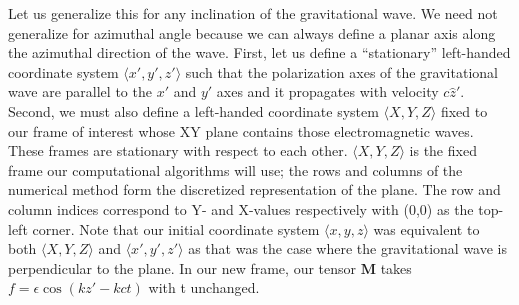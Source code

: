 \documentclass{article}
\begin{document}
Let us generalize this for any inclination of the gravitational wave. We need not generalize for azimuthal angle because we can always define a planar axis along the azimuthal direction of the wave. First, let us define a ``stationary'' left-handed coordinate system $\langle x\prime,y\prime,z\prime\rangle$ such that the polarization axes of the gravitational wave are parallel to the $x\prime$ and $y\prime$ axes and it propagates with velocity $c \hat z\prime$. Second, we must also define a left-handed coordinate system $\langle X,Y,Z \rangle$ fixed to our frame of interest whose XY plane contains those electromagnetic waves. These frames are stationary with respect to each other. $\langle X,Y,Z \rangle$ is the fixed frame our computational algorithms will use; the rows and columns of the numerical method form the discretized representation of the plane. The row and column indices correspond to Y- and X-values respectively with (0,0) as the top-left corner. Note that our initial coordinate system $\langle x,y,z\rangle$ was equivalent to both $\langle X,Y,Z\rangle$ and $\langle x\prime,y\prime,z\prime\rangle$ as that was the case where the gravitational wave is perpendicular to the plane. In our new frame, our tensor $\textbf{M}$ takes $f=\epsilon \cos(kz\prime-kct)$ with t unchanged.
\end{document}
